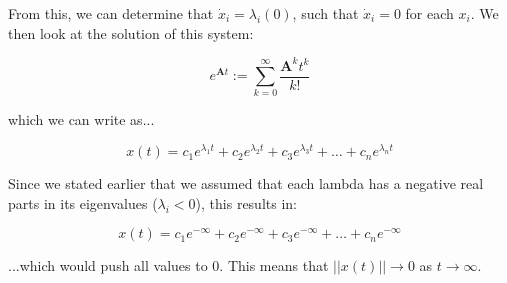 \documentclass{article}
\begin{document}
From this, we can determine that $\dot{x}_i = \lambda_i(0)$, such that $\dot{x}_i = 0$ for each $x_i$. We then look at the solution of this system:

\begin{equation}
    e^{\boldsymbol{A}t} := \sum_{k=0}^{\infty} \frac{\boldsymbol{A}^k t^k}{k!}
\end{equation}

which we can write as...

\begin{equation}
    x(t) = c_1 e^{\lambda_1 t} + c_2 e^{\lambda_2 t} + c_3 e^{\lambda_3 t} + \dots + c_n e^{\lambda_n t}
\end{equation}

Since we stated earlier that we assumed that each lambda has a negative real parts in its eigenvalues ($\lambda_i < 0$), this results in:

\begin{equation}
    x(t) = c_1 e^{-\infty} + c_2 e^{-\infty} + c_3 e^{-\infty} + \dots + c_n e^{-\infty}
\end{equation}

...which would push all values to 0. This means that $\lvert \lvert x(t) \rvert \rvert \to 0$ as $ t \to \infty$.
\end{document}
